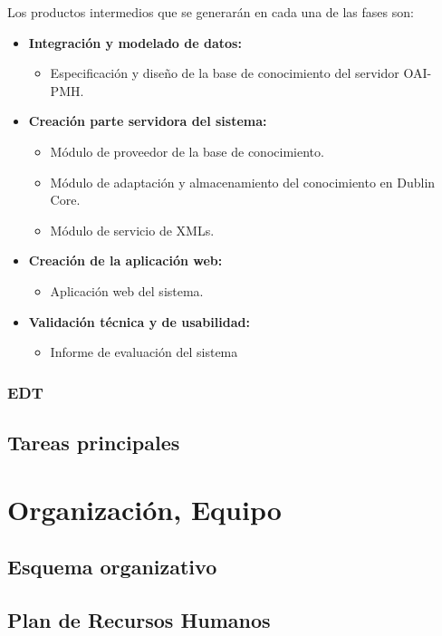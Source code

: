 Los productos intermedios que se generarán en cada una de las fases son:

\begin{itemize}
	\item \textbf{Integración y modelado de datos:}
	\begin{itemize}
		\item Especificación y diseño de la base de conocimiento del servidor OAI-PMH.
	\end{itemize}
	\item \textbf{Creación parte servidora del sistema:}
	\begin{itemize}
		\item Módulo de proveedor de la base de conocimiento.
		\item Módulo de adaptación y almacenamiento del conocimiento en Dublin Core.
		\item Módulo de servicio de XMLs.
	\end{itemize}
	\item \textbf{Creación de la aplicación web:}
	\begin{itemize}
		\item Aplicación web del sistema. 
	\end{itemize}
	\item \textbf{Validación técnica y de usabilidad:}
	\begin{itemize}
		\item Informe de evaluación del sistema
	\end{itemize}
\end{itemize}

\subsection{EDT}

\section{Tareas principales}

\chapter{Organización, Equipo}

\section{Esquema organizativo}

\section{Plan de Recursos Humanos}

